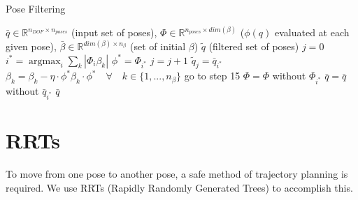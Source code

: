 \documentclass[letterpaper, 10pt, conference]{ieeeconf}
\DeclareMathOperator*{\argmax}{argmax}
\begin{document}
\begin{algorithm}
    \caption{Pose Filtering}
    \begin{algorithmic}[1]
        \renewcommand{\algorithmicrequire}{\textbf{Input:}}
        \renewcommand{\algorithmicensure}{\textbf{Output:}}
        \REQUIRE $\bar{q} \in \mathbb{R}^{n_{DOF} \times n_{poses}}$ (input set
        of poses),
        \newline $\Phi \in \mathbb{R}^{n_{poses} \times dim(\beta)}$ ($\phi(q)$ evaluated at each given pose),
        \newline $\bar{\beta} \in \mathbb{R}^{dim(\beta) \times n_{\beta}}$ (set of initial $\beta$)
        \ENSURE  $\widetilde{q}$ (filtered set of poses)
        \STATE $ j = 0 $
        \STATE $i^* = \argmax_i \sum_k | \Phi_i \beta_k |$
        \STATE $\phi^* = \Phi_{i^{*}}$
        \STATE $j = j + 1$
        \STATE $\widetilde{q}_j = \bar{q}_{i^*} $
        \STATE $\beta_k = \beta_k - \eta \cdot \phi^* \beta_k \cdot \phi^* \quad \forall \quad k \in \{1, ..., n_\beta \}$
        \STATE go to step 15
        \ELSE
        \STATE $\Phi = \Phi $ without $ \Phi_{i^*} $
        \STATE $\bar{q} = \bar{q} $ without $ \bar{q}_{i^*} $
        \ENDIF
        \ENDWHILE
        \RETURN $\bar{q}$
    \end{algorithmic}
\end{algorithm}

\section{RRTs}

To move from one pose to another pose, a safe method of trajectory planning is
required. We use RRTs (Rapidly Randomly Generated Trees) to accomplish this.
\end{document}
